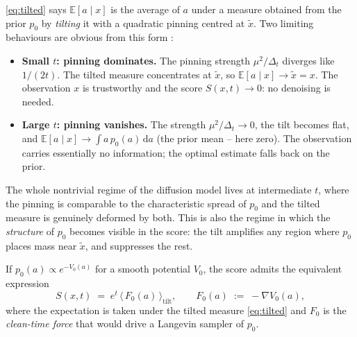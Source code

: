 \documentclass[11pt]{article}
\theoremstyle{definition}
\newcommand{\E}{\mathbb{E}}
\newcommand{\Detl}{\Delta_t}
\begin{document}
\begin{intuition}[: \(\widetilde x = e^t x\) is the projected clean
trajectory; the pinning strength tells us how to trust it]
\eqref{eq:tilted} says \(\E[a \mid x]\) is the average of \(a\) under
a measure obtained from the prior \(p_0\) by \emph{tilting} it with
a quadratic pinning centred at \(\widetilde x\). Two limiting
behaviours are obvious from this form
\citep{Efron2011}:
\begin{itemize}[leftmargin=1.4em, topsep=2pt, itemsep=2pt]
\item \textbf{Small \(t\): pinning dominates.} The pinning strength
\(\mu^2 / \Detl\) diverges like \(1 / (2 t)\). The tilted measure
concentrates at \(\widetilde x\), so \(\E[a \mid x] \to \widetilde x =
x\). The observation \(x\) is trustworthy and the score
\(S(x, t) \to 0\): no denoising is needed.
\item \textbf{Large \(t\): pinning vanishes.} The strength
\(\mu^2 / \Detl \to 0\), the tilt becomes flat, and \(\E[a \mid x] \to
\int a\, p_0(a)\, \mathrm d a\) (the prior mean -- here zero). The
observation carries essentially no information; the optimal estimate
falls back on the prior.
\end{itemize}
The whole nontrivial regime of the diffusion model lives at
intermediate \(t\), where the pinning is comparable to the
characteristic spread of \(p_0\) and the tilted measure is genuinely
deformed by both. This is also the regime in which the
\emph{structure} of \(p_0\) becomes visible in the score: the tilt
amplifies any region where \(p_0\) places mass near \(\widetilde x\),
and suppresses the rest.
\end{intuition}

\begin{bayesianview}
If \(p_0(a) \propto e^{-V_0(a)}\) for a smooth potential \(V_0\), the
score admits the equivalent expression
\citep{Efron2011}
\begin{equation}\label{eq:score-as-force}
    S(x, t) \;=\; e^{t}\, \bigl\langle\, F_0(a) \,\bigr\rangle_{\!\text{tilt}},
    \qquad
    F_0(a) \;:=\; -\nabla V_0(a),
\end{equation}
where the expectation is taken under the tilted measure
\eqref{eq:tilted} and \(F_0\) is the \emph{clean-time force} that
would drive a Langevin sampler of \(p_0\).
\end{bayesianview}
\end{document}
